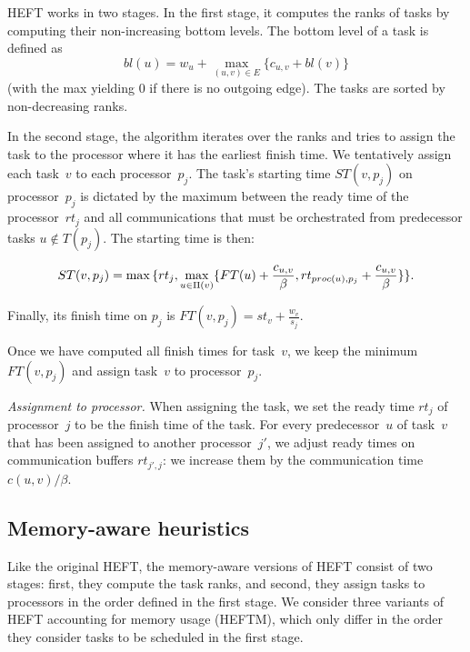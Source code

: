 \documentclass[conference]{IEEEtran}
\begin{document}
HEFT works in two stages.
In the first stage, it computes the ranks of tasks by computing their non-increasing bottom levels.
The bottom level of a task is defined as
\[
bl(u) = w_u + \max_{(u,v)\in E} \{c_{u,v} + bl(v)\}
\]
(with the max yielding $0$ if there is no outgoing edge).
The tasks are sorted by non-decreasing ranks.

In the second stage, the algorithm iterates over the ranks and tries to assign the task to the processor where it
has the earliest finish time.
We tentatively assign each task~$v$ to each processor~$p_j$.
The task's starting time $ST(v,p_j)$ on processor~$p_j$ is dictated by the maximum between the ready time of the processor~$rt_j$
and all communications that
must be orchestrated from predecessor tasks $u\notin T(p_j)$.
The starting time is then:

{\footnotesize{   \[ST(v, p_j) = \max{ \Large\{rt_j, \max_{ u \in \Pi(v)}\{ FT(u)+ \frac{c_{u,v}}{\beta} , 
rt_{proc(u), p_j} + \frac{c_{u,v}}{\beta}  \} \Large\} } . \]}}

Finally, its finish time on $p_j$ is
$FT(v,p_j) = st_v + \frac{w_v}{s_j}$.

Once we have computed all finish times for task~$v$,
we keep the minimum $FT(v,p_j)$ and assign task~$v$
to processor~$p_j$.

\textit{Assignment to processor. }
When assigning the task, we set the ready time $rt_j$ of  processor~$j$ to be the finish time of the task.
For every predecessor~$u$ of task~$v$ that has been assigned to another processor~$j'$, we adjust ready times on
communication buffers $rt_{j', j}$: %
we increase them by the
communication time $c( u,v) / \beta$.


\subsection{Memory-aware heuristics}
\label{sec.heftm}
%
Like the original HEFT, the memory-aware versions of HEFT consist of two stages:
first, they compute the task ranks,
and second, they assign tasks to processors in the order defined in the first stage.
We consider three variants of HEFT accounting for memory usage (HEFTM), which only
differ in the order they consider tasks to be scheduled in the first stage.

\smallskip
{}
\end{document}
